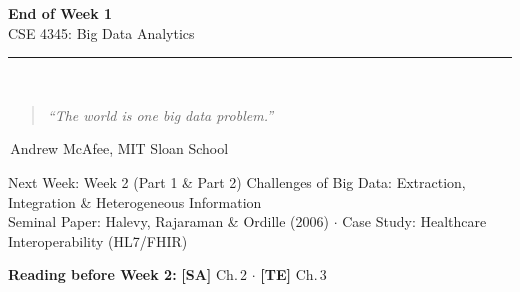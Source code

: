 \documentclass[aspectratio=169,10pt]{beamer}
\begin{document}
\begin{frame}[c]
  \begin{center}
    {\Large\bfseries End of Week 1}\\[10pt]
    {\large CSE 4345: Big Data Analytics}\\[8pt]
    \textcolor{PUGray}{\rule{7cm}{0.5pt}}\\[10pt]
    \begin{quote}
      \itshape ``The world is one big data problem.''
    \end{quote}
    \hfill\textemdash\,Andrew McAfee, MIT Sloan School
    \vspace{16pt}
    \begin{block}{\centering Next Week: Week 2 (Part 1 \& Part 2)}
      \centering
      Challenges of Big Data: Extraction, Integration \& Heterogeneous Information\\[4pt]
      \small Seminal Paper: Halevy, Rajaraman \& Ordille (2006) $\cdot$ Case Study: Healthcare Interoperability (HL7/FHIR)
    \end{block}
    \vspace{8pt}
    \textbf{Reading before Week 2:} \textbf{[SA]} Ch.\,2 $\cdot$ \textbf{[TE]} Ch.\,3
  \end{center}
\end{frame}

\end{document}
